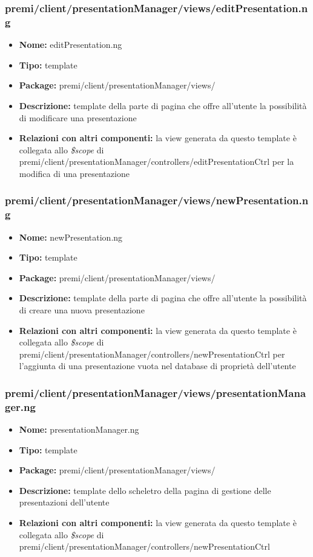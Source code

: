 \subsubsection{premi/client/presentationManager/views/editPresentation.ng}
\begin{itemize}
  \item[] \textbf{Nome:} editPresentation.ng
  \item[] \textbf{Tipo:} template
  \item[] \textbf{Package:}  premi/client/presentationManager/views/
  \item[] \textbf{Descrizione:} template della parte di pagina che offre all'utente la possibilità di modificare una presentazione
  \item[] \textbf{Relazioni con altri componenti:}  la view generata da questo template è collegata allo \textit{\$scope} di premi/client/presentationManager/controllers/editPresentationCtrl per la modifica di una presentazione
\end{itemize}

\subsubsection{premi/client/presentationManager/views/newPresentation.ng}
\begin{itemize}
  \item[] \textbf{Nome:} newPresentation.ng
  \item[] \textbf{Tipo:} template
  \item[] \textbf{Package:} premi/client/presentationManager/views/
  \item[] \textbf{Descrizione:} template della parte di pagina che offre all'utente la possibilità di creare una nuova presentazione
  \item[] \textbf{Relazioni con altri componenti:}  la view generata da questo template è collegata allo \textit{\$scope} di premi/client/presentationManager/controllers/newPresentationCtrl per l'aggiunta di una presentazione vuota nel database di proprietà dell'utente
\end{itemize}

\subsubsection{premi/client/presentationManager/views/presentationManager.ng}
\begin{itemize}
  \item[] \textbf{Nome:} presentationManager.ng
  \item[] \textbf{Tipo:} template
  \item[] \textbf{Package:} premi/client/presentationManager/views/
  \item[] \textbf{Descrizione:} template dello scheletro della pagina di gestione delle presentazioni dell'utente
  \item[] \textbf{Relazioni con altri componenti:}  la view generata da questo template è collegata allo \textit{\$scope} di premi/client/presentationManager/controllers/newPresentationCtrl
\end{itemize}

